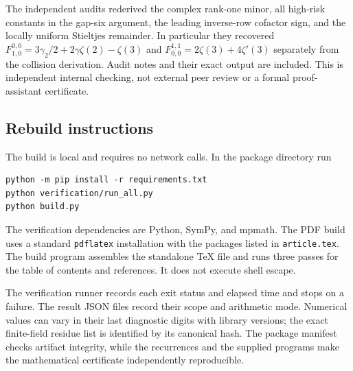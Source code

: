 \documentclass[11pt,a4paper]{article}
\theoremstyle{definition}
\theoremstyle{remark}
\numberwithin{equation}{section}
\begin{document}
The independent audits rederived the complex rank-one minor,
all high-risk constants in the gap-six argument, the leading
inverse-row cofactor sign, and the locally uniform Stieltjes
remainder. In particular they recovered
$F_{1,0}^{0,0}=3\gamma_2/2+2\gamma\zeta(2)-\zeta(3)$ and
$F_{0,0}^{1,1}=2\zeta(3)+4\zeta'(3)$ separately from the
collision derivation. Audit notes and their exact output are
included. This is independent internal checking, not external
peer review or a formal proof-assistant certificate.

\subsection{Rebuild instructions}

The build is local and requires no network calls. In the package
directory run
\begin{verbatim}
python -m pip install -r requirements.txt
python verification/run_all.py
python build.py
\end{verbatim}
The verification dependencies are Python, SymPy, and mpmath.
The PDF build uses a standard \texttt{pdflatex} installation with
the packages listed in \texttt{article.tex}. The build program
assembles the standalone \TeX{} file and runs three passes for
the table of contents and references. It does not execute shell
escape.

The verification runner records each exit status and elapsed
time and stops on a failure. The result JSON files record their
scope and arithmetic mode. Numerical values can vary in their
last diagnostic digits with library versions; the exact
finite-field residue list is identified by its canonical hash.
The package manifest checks artifact integrity, while the
recurrences and the supplied programs make the mathematical
certificate independently reproducible.


\end{document}
